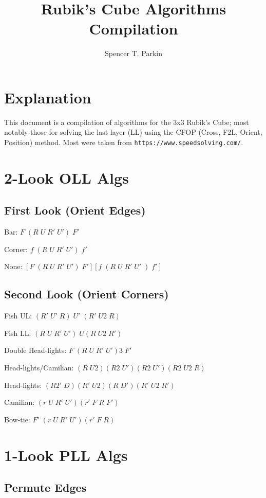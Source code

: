 \documentclass[12pt]{article}
\title{Rubik's Cube Algorithms Compilation}
\author{Spencer T. Parkin}
\begin{document}
\maketitle

\section*{Explanation}

This document is a compilation of algorithms for the 3x3 Rubik's Cube; most notably those
for solving the last layer (LL) using the CFOP (Cross, F2L, Orient, Position) method.
Most were taken from \texttt{https://www.speedsolving.com/}.

\section*{2-Look OLL Algs}

\subsection*{First Look (Orient Edges)}

Bar: $F\;(R\;U\;R'\;U')\;F'$

\noindent
Corner: $f\;(R\;U\;R'\;U')\;f'$

\noindent
None: $[F\;(R\;U\;R'\;U')\;F'][f\;(R\;U\;R'\;U'\;)\;f']$

\subsection*{Second Look (Orient Corners)}

Fish UL: $(R'\;U'\;R)\;U'\;(R'\;U2\;R)$

\noindent
Fish LL: $(R\;U\;R'\;U')\;U(R\;U2\;R')$

\noindent
Double Head-lights: $F\;(R\;U\;R'\;U')3\;F'$

\noindent
Head-lights/Camilian: $(R\;U2)(R2\;U')(R2\;U')(R2\;U2\;R)$

\noindent
Head-lights: $(R2'\;D)(R'\;U2)(R\;D')(R'\;U2\;R')$

\noindent
Camilian: $(r\;U\;R'\;U')(r'\;F\;R\;F')$

\noindent
Bow-tie: $F'\;(r\;U\;R'\;U')(r'\;F\;R)$

\section*{1-Look PLL Algs}

\subsection*{Permute Edges}
\end{document}
